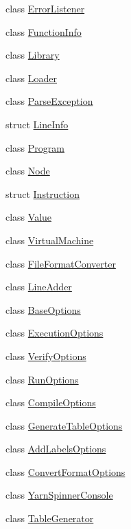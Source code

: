 \begin{DoxyCompactItemize}
class \hyperlink{a00098}{Error\-Listener}
\item 
class \hyperlink{a00103}{Function\-Info}
\item 
class \hyperlink{a00123}{Library}
\item 
class \hyperlink{a00127}{Loader}
\item 
class \hyperlink{a00137}{Parse\-Exception}
\item 
struct \hyperlink{a00125}{Line\-Info}
\item 
class \hyperlink{a00140}{Program}
\item 
class \hyperlink{a00050_a00354}{Node}
\item 
struct \hyperlink{a00115}{Instruction}
\item 
class \hyperlink{a00167}{Value}
\item 
class \hyperlink{a00147}{Virtual\-Machine}
\item 
class \hyperlink{a00102}{File\-Format\-Converter}
\item 
class \hyperlink{a00124}{Line\-Adder}
\item 
class \hyperlink{a00042}{Base\-Options}
\item 
class \hyperlink{a00101}{Execution\-Options}
\item 
class \hyperlink{a00171}{Verify\-Options}
\item 
class \hyperlink{a00144}{Run\-Options}
\item 
class \hyperlink{a00054}{Compile\-Options}
\item 
class \hyperlink{a00104}{Generate\-Table\-Options}
\item 
class \hyperlink{a00041}{Add\-Labels\-Options}
\item 
class \hyperlink{a00057}{Convert\-Format\-Options}
\item 
class \hyperlink{a00174}{Yarn\-Spinner\-Console}
\item 
class \hyperlink{a00153}{Table\-Generator}
\end{DoxyCompactItemize}
